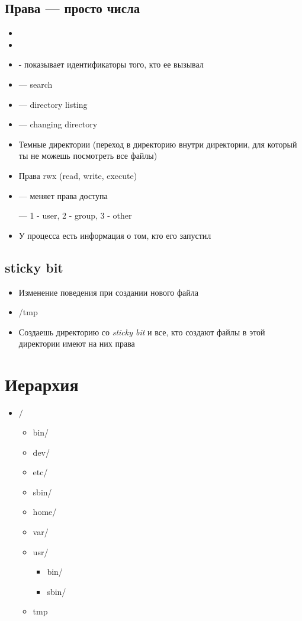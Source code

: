 \documentclass[../lectures.tex]{subfiles}
\begin{document}
\subsection{Права --- просто числа}
\begin{itemize}
    \item {}
    \item {}
    \item {} - показывает идентификаторы того, кто ее вызывал
    \item {} --- search
    \item {} --- directory listing
    \item {} --- changing directory
    \item Темные директории (переход в директорию внутри директории, для который ты не можешь посмотреть все файлы)
    \item Права rwx (read, write, execute)
    \item {} --- меняет права доступа
          
           --- 1 - user, 2 - group, 3 - other
    \item У процесса есть информация о том, кто его запустил
\end{itemize}
\subsection{sticky bit}
\begin{itemize}
    \item Изменение поведения при создании нового файла
    \item /tmp
    \item Создаешь директорию со \emph{sticky bit} и все, кто создают файлы в этой директории имеют на них права
\end{itemize}

\section{Иерархия}
\begin{itemize}
    \item $/$
        \begin{itemize}
            \item bin/
            \item dev/
            \item etc/
            \item sbin/
            \item home/
            \item var/
            \item usr/
                \begin{itemize}
                    \item bin/
                    \item sbin/
                \end{itemize}
            \item tmp
        \end{itemize}
\end{itemize}
\end{document}
